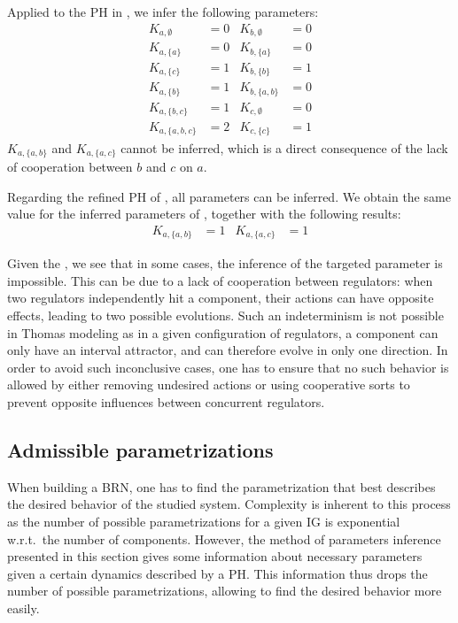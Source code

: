 \begin{example}
\label{ex:infer-param-runningPH-1}

Applied to the PH in , we infer the following parameters:
\begin{align*}
K_{a, \emptyset} &= 0&
K_{b, \emptyset} &= 0 \\
K_{a, \{a\}} &= 0 &
K_{b, \{a\}} &= 0 \\
K_{a, \{c\}} &= 1 &
K_{b, \{b\}} &= 1 \\
K_{a, \{b\}} &= 1 &
K_{b, \{a,b\}} &= 0 \\
K_{a, \{b,c\}} &= 1 &
K_{c, \emptyset} &= 0 \\
K_{a, \{a,b,c\}} &= 2 &
K_{c, \{c\}} &= 1
\end{align*}
$K_{a,\{a,b\}}$ and $K_{a,\{a,c\}}$ cannot be inferred,
which is a direct consequence of the lack of cooperation between $b$ and $c$ on $a$.
\end{example}

\begin{example}
Regarding the refined PH of , all parameters can be inferred.
We obtain the same value for the inferred parameters of ,
together with the following results:
\begin{align*}
  K_{a,\{a,b\}} &= 1 &
  K_{a,\{a,c\}} &= 1
\end{align*}
\end{example}

Given the , we see that in some cases, the inference of the targeted parameter is impossible.
This can be due to a lack of cooperation between regulators:
when two regulators independently hit a component, their actions can have opposite effects, leading to two possible evolutions.
Such an indeterminism is not possible in Thomas modeling as in a given configuration of regulators,
a component can only have an interval attractor, and can therefore evolve in only one direction.
In order to avoid such inconclusive cases, one has to ensure that no such behavior is allowed by
either removing undesired actions or using cooperative sorts to prevent opposite influences between
concurrent regulators.

\subsection{Admissible parametrizations}\label{ssec:admissible-K}

When building a BRN, one has to find the parametrization that best describes the desired behavior of the studied system.
Complexity is inherent to this process as the number of possible parametrizations for a given IG is exponential w.r.t.~the number of components.
However, the method of parameters inference presented in this section gives some information about necessary parameters given a certain dynamics described by a PH.
This information thus drops the number of possible parametrizations, allowing to find the desired behavior more easily.

